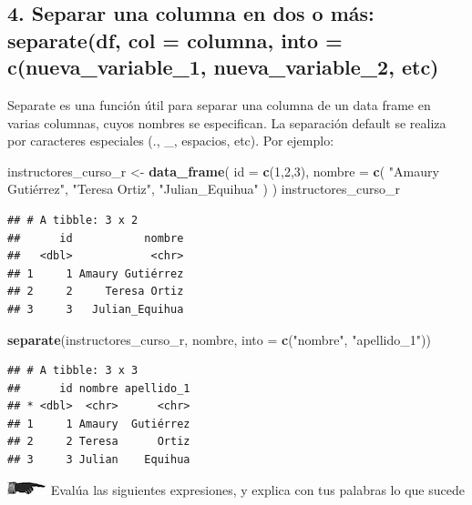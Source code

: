 \documentclass[]{book}
\newenvironment{Shaded}{\begin{snugshade}}{\end{snugshade}}
\newcommand{\KeywordTok}[1]{\textcolor[rgb]{0.13,0.29,0.53}{\textbf{#1}}}
\newcommand{\DataTypeTok}[1]{\textcolor[rgb]{0.13,0.29,0.53}{#1}}
\newcommand{\DecValTok}[1]{\textcolor[rgb]{0.00,0.00,0.81}{#1}}
\newcommand{\StringTok}[1]{\textcolor[rgb]{0.31,0.60,0.02}{#1}}
\newcommand{\NormalTok}[1]{#1}
\theoremstyle{definition}
\theoremstyle{definition}
\theoremstyle{definition}
\theoremstyle{remark}
\begin{document}
\subsection{4. Separar una columna en dos o más: separate(df, col =
columna, into = c(nueva\_variable\_1, nueva\_variable\_2,
etc)}\label{separar-una-columna-en-dos-o-mas-separatedf-col-columna-into-cnueva_variable_1-nueva_variable_2-etc}

Separate es una función útil para separar una columna de un data frame
en varias columnas, cuyos nombres se especifican. La separación default
se realiza por caracteres especiales (., \_, espacios, etc). Por
ejemplo:

\begin{Shaded}
\begin{Highlighting}[]
\NormalTok{instructores_curso_r <-}\StringTok{ }\KeywordTok{data_frame}\NormalTok{(}
  \DataTypeTok{id =} \KeywordTok{c}\NormalTok{(}\DecValTok{1}\NormalTok{,}\DecValTok{2}\NormalTok{,}\DecValTok{3}\NormalTok{),}
  \DataTypeTok{nombre =} \KeywordTok{c}\NormalTok{(}
    \StringTok{"Amaury Gutiérrez"}\NormalTok{,}
    \StringTok{"Teresa Ortiz"}\NormalTok{,}
    \StringTok{"Julian_Equihua"}
\NormalTok{  )}
\NormalTok{)}
\NormalTok{instructores_curso_r}
\end{Highlighting}
\end{Shaded}

\begin{verbatim}
## # A tibble: 3 x 2
##      id           nombre
##   <dbl>            <chr>
## 1     1 Amaury Gutiérrez
## 2     2     Teresa Ortiz
## 3     3   Julian_Equihua
\end{verbatim}

\begin{Shaded}
\begin{Highlighting}[]
\KeywordTok{separate}\NormalTok{(instructores_curso_r, nombre, }\DataTypeTok{into =} \KeywordTok{c}\NormalTok{(}\StringTok{"nombre"}\NormalTok{, }\StringTok{"apellido_1"}\NormalTok{))}
\end{Highlighting}
\end{Shaded}

\begin{verbatim}
## # A tibble: 3 x 3
##      id nombre apellido_1
## * <dbl>  <chr>      <chr>
## 1     1 Amaury  Gutiérrez
## 2     2 Teresa      Ortiz
## 3     3 Julian    Equihua
\end{verbatim}

\includegraphics{./imagenes/manicule2.jpg} Evalúa las siguientes
expresiones, y explica con tus palabras lo que sucede
\end{document}
